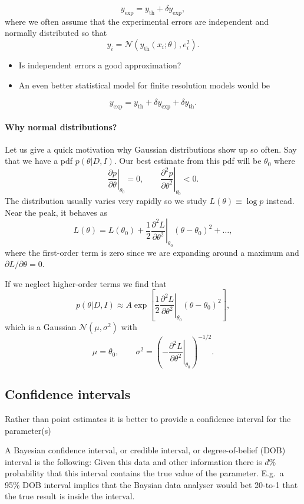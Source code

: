 \documentclass[%
oneside,                 %
final,                   %
10pt]{article}
\newenvironment{block_mdfboxadmon}[1][]{
\begin{block_mdfboxmdframed}[frametitle=#1]
}
{
\end{block_mdfboxmdframed}
}
\begin{document}
\noindent
\[
y_\mathrm{exp} = y_\mathrm{th} + \delta y_\mathrm{exp},
\]
where we often assume that the experimental errors are independent and normally distributed so that
\[
y_i = \mathcal{N} \left( y_\mathrm{th}(x_i; \theta), e_i^2 \right).
\]

\begin{itemize}
\item Is independent errors a good approximation?

\item An even better statistical model for finite resolution models would be
\end{itemize}

\noindent
\[
y_\mathrm{exp} = y_\mathrm{th} + \delta y_\mathrm{exp} + \delta y_\mathrm{th}.
\]

\paragraph{Why normal distributions?}
Let us give a quick motivation why Gaussian distributions show up so often. Say that we have a pdf $p(\theta | D,I)$. Our best estimate from this pdf will be $\theta_0$ where
\[ 
\left. 
\frac{ \partial p }{ \partial \theta }
\right|_{\theta_0} = 0, \qquad
\left. \frac{ \partial^2 p }{ \partial \theta^2 }
\right|_{\theta_0} < 0.
\]
The distribution usually varies very rapidly so we study $L(\theta) \equiv \log p$ instead.
Near the peak, it behaves as
\[
L(\theta) = L(\theta_0) + \frac{1}{2} \left. \frac{\partial^2 L}{\partial \theta^2} \right|_{\theta_0} \left( \theta - \theta_0 \right)^2 + \ldots,
\]
where the first-order term is zero since we are expanding around a maximum and $\partial L / \partial\theta = 0$.

If we neglect higher-order terms we find that 
\[
p(\theta|D,I) \approx A \exp \left[ \frac{1}{2} \left. \frac{\partial^2 L}{\partial \theta^2} \right|_{\theta_0} \left( \theta - \theta_0 \right)^2  \right],
\]
which is a Gaussian $\mathcal{N}(\mu,\sigma^2)$ with
\[
\mu = \theta_0, \qquad \sigma^2 = \left( - \left. \frac{\partial^2 L}{\partial \theta^2} \right|_{\theta_0} \right)^{-1/2}.
\]

\subsection{Confidence intervals}
Rather than point estimates it is better to provide a confidence interval for the parameter(s)


\begin{block_mdfboxadmon}[]
A Bayesian confidence interval, or credible interval, or degree-of-belief (DOB) interval is the following: Given this data and other information there is $d \%$ probability that this interval contains the true value of the parameter. E.g.~a 95\% DOB interval implies that the Baysian data analyser would bet 20-to-1 that the true result is inside the interval.
\end{block_mdfboxadmon} %
\end{document}
